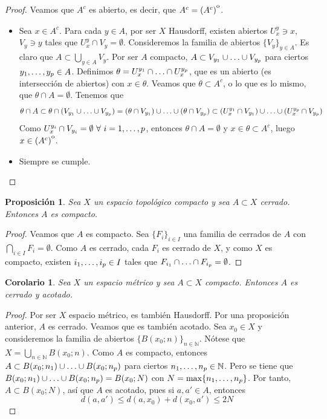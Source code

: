 \documentclass[12pt]{report}
\newtheorem{proposition}{Proposición}[chapter]
\newtheorem{corollary}{Corolario}[chapter]
\theoremstyle{definition}
\theoremstyle{definition}
\theoremstyle{remark}
\newcommand{\N}{\mathbb N}
\begin{document}
\begin{proof}
Veamos que $A^c$ es abierto, es decir, que $A^c = (A^c)\strut^\mathrm{o}$.  
\begin{itemize}
    \item[{\fbox[rb]{$\subset$}}] Sea $x \in A^c$. Para cada $y \in A$, por ser $X$ Hausdorff, existen abiertos $\displaystyle U_x^y \ni x$, $V_y \ni y$ tales que $\displaystyle U_x^y \cap V_y = \emptyset$. Consideremos la familia de abiertos $\{V_y\}_{y \in A}$. Es claro que $A \subset \bigcup_{y \in A}V_y$. Por ser $A$ compacto, $A \subset V_{y_1} \cup \mathellipsis \cup V_{y_p}$ para ciertos $y_1,\mathellipsis,y_p \in A$. Definimos $\displaystyle \theta = U_x^{y_1} \cap \mathellipsis \cap U_x^{y_p}$, que es un abierto (es intersección de abiertos) con $x \in \theta$. Veamos que $\theta \subset A^c$, o lo que es lo mismo, que $\theta \cap A = \emptyset$. Tenemos que
    \[\theta \cap A \subset \theta \cap (V_{y_1} \cup \mathellipsis \cup V_{y_p}) = (\theta \cap V_{y_1}) \cup \mathellipsis \cup (\theta \cap V_{y_p}) \subset (U_x^{y_1} \cap V_{y_1}) \cup \mathellipsis \cup (U_x^{y_p} \cap V_{y_p})\]
    Como $\displaystyle U_x^{y_i} \cap V_{y_i} = \emptyset \ \forall \ i = 1,\mathellipsis,p$, entonces $\theta \cap A = \emptyset$ y $x \in \theta \subset A^c$, luego $x \in (A^c)\strut^\mathrm{o}$.
    \item[{\fbox[rb]{$\supset$}}] Siempre se cumple.
\end{itemize}
\end{proof}

\begin{proposition}
Sea $X$ un espacio topológico compacto y sea $A \subset X$ cerrado. Entonces $A$ es compacto.
\end{proposition}

\begin{proof}
Veamos que $A$ es compacto. Sea $\{F_i\}_{i \in I}$ una familia de cerrados de $A$ con $\bigcap_{i \in I}F_i = \emptyset$. Como $A$ es cerrado, cada $F_i$ es cerrado de $X$, y como $X$ es compacto, existen $i_1,\mathellipsis,i_p \in I$ tales que $F_{i_1} \cap \mathellipsis \cap F_{i_p} = \emptyset$.
\end{proof}

\begin{corollary}
Sea $X$ un espacio métrico y sea $A \subset X$ compacto. Entonces $A$ es cerrado y acotado.
\end{corollary}

\begin{proof}
Por ser $X$ espacio métrico, es también Hausdorff. Por una proposición anterior, $A$ es cerrado. Veamos que es también acotado. Sea $x_0 \in X$ y consideremos la familia de abiertos $\{B(x_0;n)\}_{n \in \N}$. Nótese que $X = \bigcup_{n \in \N}B(x_0;n)$. Como $A$ es compacto, entonces $A \subset B(x_0;n_1) \cup \mathellipsis \cup B(x_0;n_p)$ para ciertos $n_1,\mathellipsis,n_p \in \N$. Pero se tiene que $B(x_0;n_1) \cup \mathellipsis \cup B(x_0;n_p) = B(x_0;N)$ con $N = \max\{n_1,\mathellipsis,n_p\}$. Por tanto, $A \subset B(x_0;N)$, así que $A$ es acotado, pues si $a, a' \in A$, entonces
\[d(a,a') \leq d(a,x_0)+d(x_0,a') \leq 2N\]
\end{proof}
\end{document}
